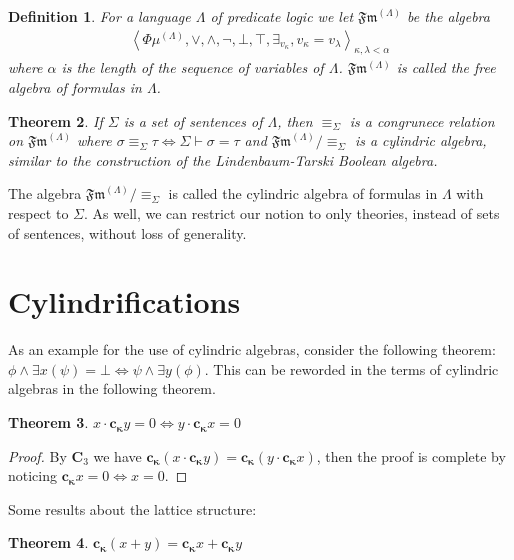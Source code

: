 \documentclass[12pt,a4paper]{article}
\newtheorem{theorem}{Theorem}[section]
\newtheorem{definition}[theorem]{Definition}
\begin{document}
\begin{definition}
For a language $\Lambda$ of predicate logic we let $\mathfrak{Fm}^{(\Lambda)}$ be the algebra 
\begin{align*}
    \left< \Phi\mu^{(\Lambda)},\vee,\wedge,\neg,\bot,\top,\exists_{v_\kappa},v_\kappa=v_\lambda\right>_{\kappa,\lambda<\alpha}
\end{align*}
where $\alpha$ is the length of the sequence of variables of $\Lambda$. $\mathfrak{Fm^{(\Lambda)}}$ is called the free algebra of formulas in $\Lambda$.
\end{definition}

\begin{theorem}
If $\Sigma$ is a set of sentences of $\Lambda$, then $\equiv_\Sigma$ is a congrunece relation on $\mathfrak{Fm}^{(\Lambda)}$ where $\sigma\equiv_\Sigma\tau \iff\Sigma \vdash \sigma=\tau$ and $\mathfrak{Fm}^{(\Lambda)}/\equiv_\Sigma$ is a cylindric algebra, similar to the construction of the Lindenbaum-Tarski Boolean algebra.
\end{theorem}

The algebra $\mathfrak{Fm}^{(\Lambda)}/\equiv_\Sigma$ is called the cylindric algebra of formulas in $\Lambda$ with respect to $\Sigma$. As well, we can restrict our notion to only theories, instead of sets of sentences, without loss of generality.

\section{Cylindrifications}

As an example for the use of cylindric algebras, consider the following theorem: $\phi \wedge \exists x(\psi) = \bot \iff \psi\wedge\exists y(\phi)$. This can be reworded in the terms of cylindric algebras in the following theorem.

\begin{theorem}
$x \cdot \mathbf{c_\kappa}y=0\iff y\cdot \mathbf{c_\kappa} x=0$
\end{theorem}
\begin{proof}
By \textbf{C}$_3$ we have $\mathbf{c_\kappa}(x\cdot\mathbf{c_\kappa}y)=\mathbf{c_\kappa}(y\cdot\mathbf{c_\kappa}x)$, then the proof is complete by noticing $\mathbf{c_\kappa}x=0\iff x=0$.
\end{proof}

Some results about the lattice structure:

\begin{theorem}
$\mathbf{c_\kappa}(x+y)=\mathbf{c_\kappa}x+\mathbf{c_\kappa}y$
\end{theorem}
\end{document}
